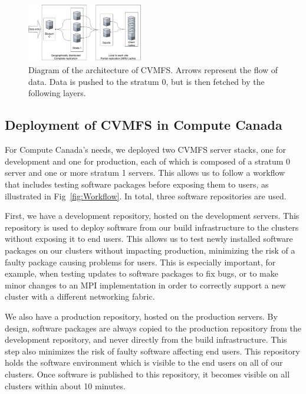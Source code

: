 \documentclass[sigconf]{acmart}
\begin{document}
\begin{figure}
  \includegraphics[width=0.45\textwidth]{CVMFS-structure.pdf}
  \caption{Diagram of the architecture of CVMFS. Arrows represent the flow of data. Data is pushed to the stratum 0, but is then fetched by the following layers.}
  \label{fig:CVMFS_structure}
\end{figure}

\subsection{Deployment of CVMFS in Compute Canada}
\label{sub:CVMFS_in_CC}
For Compute Canada's needs, we deployed two CVMFS server stacks, one for development and one for production, each of which is composed of a stratum 0 server and one or more stratum 1 servers. This allows us to follow a workflow that includes testing software packages before exposing them to users, as illustrated in Fig~\ref{fig:Workflow}. In total, three software repositories are used.

First, we have a development repository, hosted on the development servers. This repository is used to deploy software from our build infrastructure to the clusters without exposing it to end users. This allows us to test newly installed software packages on our clusters without impacting production, minimizing the risk of a faulty package causing problems for users. This is especially important, for example, when testing updates to software packages to fix bugs, or to make minor changes to an MPI implementation in order to correctly support a new cluster with a different networking fabric. 

We also have a production repository, hosted on the production servers. By design, software packages are always copied to the production repository from the development repository, and never directly from the build infrastructure. This step also minimizes the risk of faulty software affecting end users. This repository holds the software environment which is visible to the end users on all of our clusters. Once software is published to this repository, it becomes visible on all clusters within about 10 minutes. 
\end{document}
